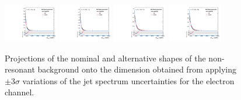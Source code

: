 \begin{figure}[htbp]
  \centering
  \includegraphics[width=0.21\textwidth]{fig/analysisAppendix/systs_nonRes_e_HP_nobb_LDy_MVVScale_ProjX.pdf}
  \includegraphics[width=0.21\textwidth]{fig/analysisAppendix/systs_nonRes_e_LP_nobb_LDy_MVVScale_ProjX.pdf}
  \includegraphics[width=0.21\textwidth]{fig/analysisAppendix/systs_nonRes_e_HP_nobb_HDy_MVVScale_ProjX.pdf}
  \includegraphics[width=0.21\textwidth]{fig/analysisAppendix/systs_nonRes_e_LP_nobb_HDy_MVVScale_ProjX.pdf}\\
  \caption{
    Projections of the nominal and alternative shapes of the non-resonant background onto the \MVV dimension obtained from applying $\pm3\sigma$ variations of the jet \pt spectrum uncertainties for the electron channel.
  }
  \label{fig:systNonResMVV_MVVScale}
\end{figure}

